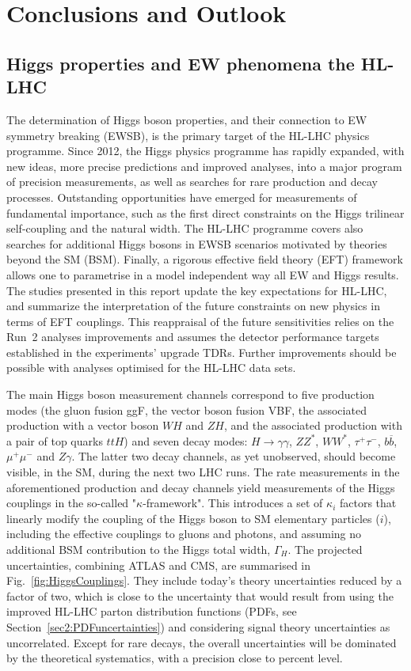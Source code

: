 \documentclass[../report.tex]{subfiles}
\begin{document}
\section{Conclusions and Outlook}
\subsection{Higgs properties and EW phenomena the HL-LHC}
The determination of Higgs boson properties, and their connection to EW symmetry breaking (EWSB), is the primary target of the HL-LHC physics programme. Since 2012, the Higgs physics programme has rapidly expanded, with new ideas, more precise predictions and improved analyses, into a major program of precision measurements, as well as  searches for rare production and decay processes. Outstanding opportunities have emerged for measurements of fundamental importance, such as the first direct constraints on the Higgs trilinear self-coupling and the natural width. The HL-LHC programme covers also searches for additional Higgs bosons in EWSB scenarios motivated by theories beyond the SM (BSM). Finally, a rigorous effective field theory (EFT) framework allows one to parametrise in a model independent way all EW and Higgs results. 
The studies presented in this report update the key expectations for HL-LHC,  and summarize the interpretation of the future constraints on new physics in terms of EFT couplings. This reappraisal of the future sensitivities relies on the Run~2 analyses improvements and assumes the detector performance targets established in the experiments' upgrade TDRs.
Further improvements should be possible with analyses optimised for the HL-LHC data sets.

The main Higgs boson measurement channels correspond to five production modes (the gluon fusion ggF, the vector boson fusion VBF, the associated production with a vector boson $WH$ and $ZH$, and the associated production with a pair of top quarks $ttH$) and seven decay modes: $H \to \gamma\gamma$, $ZZ^*$, $WW^*$, $\tau^+\tau^-$, $b\overline{b}$, $\mu^+\mu^-$ and $Z\gamma$. The latter two decay channels, as yet unobserved, should become visible, in the SM, during the next two LHC runs. 
The rate measurements in the aforementioned production and decay channels yield measurements of the Higgs couplings in the so-called "$\kappa$-framework". This introduces a set of $\kappa_i$ factors that linearly modify the coupling of the Higgs boson to SM elementary particles  ($i$), including the effective couplings to gluons and photons, and assuming no additional BSM contribution to the Higgs total width, $\Gamma_H$. The projected uncertainties, combining ATLAS and CMS, are summarised in Fig.~\ref{fig:HiggsCouplings}. They include today's theory uncertainties reduced by a factor of two, which is close to the uncertainty that would result from using the improved HL-LHC parton distribution functions (PDFs, see Section~\ref{sec2:PDFuncertainties}) and considering signal theory uncertainties as uncorrelated. Except for rare decays, the overall uncertainties will be dominated by the theoretical systematics, with a precision close to percent level.
\end{document}
